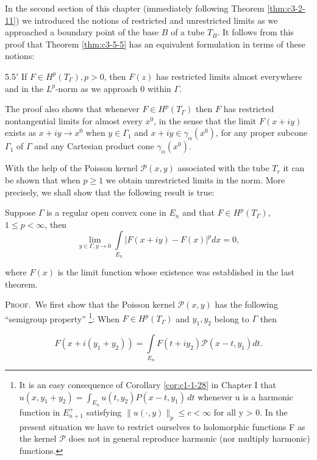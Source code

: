 In the second section of this chapter (immediately following Theorem \ref{thm:c3-2-11}) we introduced the notions of restricted and unrestricted limits as we approached a boundary point of the base $B$ of a tube $T_{B}$. It follows from this proof that Theorem \ref{thm:c3-5-5} has an equivalent formulation in terms of these notions:

\begin{customthm}{5.5$'$}
\label{thm:c3-5-5p}
If $F \in H^p(T_\Gamma), p > 0$, then $F(z)$ has restricted limits almost everywhere and in the $L^p$-norm as we approach 0 within $\Gamma$.
\end{customthm}

The proof also shows that whenever $F \in H^p(T_\Gamma)$ then $F$ has restricted nontangential limits for almost every $x^0$, in the sense that the limit $F(x + iy)$ exists as $x + iy \to x^0$ when $y \in \Gamma_1$ and $x + iy \in \gamma_\alpha(x^0)$, for any proper subcone $\Gamma_1$ of $\Gamma$ and any Cartesian product cone $\gamma_\alpha(x^0)$.

With the help of the Poisson kernel $\mathcal{P}(x, y)$ associated with the tube $T_r$ it can be shown that when $p \geq 1$ we obtain unrestricted limits in the norm. More precisely, we shall show that the following result is true:

\begin{theorem}
\label{thm:c3-5-6}
Suppose $\Gamma$ is a regular open convex cone in $E_n$ and that $F \in H^p(T_\Gamma)$, $1 \leq p < \infty$, then
\[
\lim_{y\in\Gamma,y\rightarrow0}\int\limits_{E_{n}}|F(x+i y)-F(x)|^{p}d x=0,
\]

where $F(x)$ is the limit function whose existence was established in the last theorem.
\end{theorem}

\textsc{Proof.}\ We first show that the Poisson kernel $\mathcal{P}(x, y)$ has the following ``semigroup property'' \footnote{It is an easy consequence of Corollary \ref{cor:c1-1-28} in Chapter I that $u(x, y_1 + y_2) = \int_{E_n} u(t, y_2)P(x - t, y_1) \, dt$ whenever u is a harmonic function in $E_{n+1}^+$ satisfying $\|u(\cdot, y)\|_p \leq c < \infty$ for all y > 0. In the present situation we have to restrict ourselves to holomorphic functions F as the kernel $\mathcal{P}$ does not in general reproduce harmonic (nor multiply harmonic) functions.}: When $F \in H^p(T_\Gamma)$ and $y_1, y_2$ belong to $\Gamma$ then

\begin{equation}\label{eq:c3-5-7}
F(x+i(y_{1}+y_{2}))=\int\limits_{E_{n}}F(t+i y_{2})\mathcal{P}(x-t,y_{1})d t.
\end{equation}

